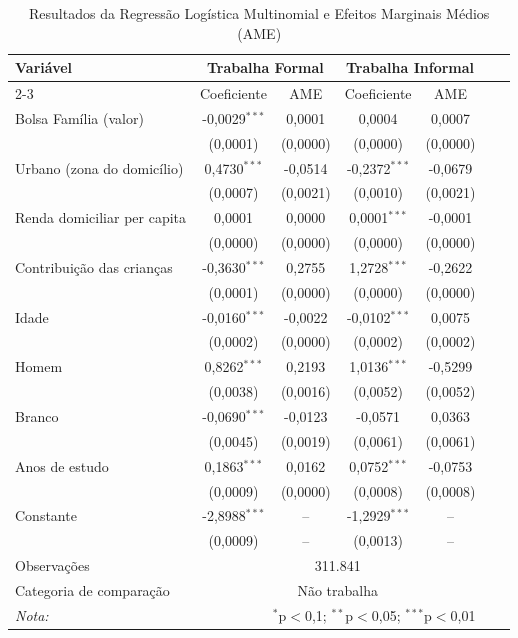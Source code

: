\documentclass[12pt, a4paper, openany]{book}
\numberwithin{equation}{chapter}
\numberwithin{table}{chapter}
\numberwithin{figure}{chapter}
\theoremstyle{break}
\begin{document}
\begin{table}[H] 
\centering 
\renewcommand{\arraystretch}{1.5}
  \caption{Resultados da Regressão Logística Multinomial e Efeitos Marginais Médios (AME)} 
  \label{tab:logit_multinomial} 
\begin{tabular}{lcccccc} 
\hline 
\hline 
Variável & \multicolumn{2}{c}{\textbf{Trabalha Formal}} & \multicolumn{2}{c}{\textbf{Trabalha Informal}} \\ 
\cline{2-3} \cline{4-5} 
         & Coeficiente & AME & Coeficiente & AME \\ 
\hline 
Bolsa Família (valor) & -0,0029$^{***}$ & 0,0001 & 0,0004 & 0,0007 \\ 
                       & (0,0001) & (0,0000) & (0,0000) & (0,0000) \\ 
Urbano (zona do domicílio) & 0,4730$^{***}$ & -0,0514 & -0,2372$^{***}$ & -0,0679 \\ 
                       & (0,0007) & (0,0021) & (0,0010) & (0,0021) \\ 
Renda domiciliar per capita & 0,0001 & 0,0000 & 0,0001$^{***}$ & -0,0001 \\ 
                            & (0,0000) & (0,0000) & (0,0000) & (0,0000) \\ 
Contribuição das crianças & -0,3630$^{***}$ & 0,2755 & 1,2728$^{***}$ & -0,2622 \\ 
                           & (0,0001) & (0,0000) & (0,0000) & (0,0000) \\ 
Idade & -0,0160$^{***}$ & -0,0022 & -0,0102$^{***}$ & 0,0075 \\ 
      & (0,0002) & (0,0000) & (0,0002) & (0,0002) \\ 
Homem & 0,8262$^{***}$ & 0,2193 & 1,0136$^{***}$ & -0,5299 \\ 
      & (0,0038) & (0,0016) & (0,0052) & (0,0052) \\ 
Branco & -0,0690$^{***}$ & -0,0123 & -0,0571 & 0,0363 \\ 
       & (0,0045) & (0,0019) & (0,0061) & (0,0061) \\ 
Anos de estudo & 0,1863$^{***}$ & 0,0162 & 0,0752$^{***}$ & -0,0753 \\ 
               & (0,0009) & (0,0000) & (0,0008) & (0,0008) \\ 
Constante & -2,8988$^{***}$ & -- & -1,2929$^{***}$ & -- \\ 
          & (0,0009) & -- & (0,0013) & -- \\ 
\hline 
Observações & \multicolumn{4}{c}{311.841} \\ 
Categoria de comparação &  \multicolumn{4}{c}{Não trabalha} \\
\hline 
\hline 
\textit{Nota:} & \multicolumn{4}{r}{$^{*}$p$<$0,1; $^{**}$p$<$0,05; $^{***}$p$<$0,01} \\ 
\end{tabular} 
\end{table}
\end{document}
